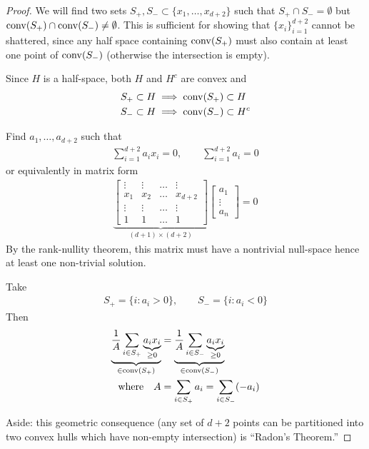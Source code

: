 \begin{proof}
    We will find two sets $S_+, S_- \subset \{x_1, \ldots, x_{d+2}\}$ such
    that $S_+ \cap S_- = \emptyset$ but
    $\operatorname{conv}(S_+) \cap \operatorname{conv}(S_-) \neq \emptyset$.
    This is sufficient for showing that $\{x_i\}_{i=1}^{d+2}$ cannot
    be shattered, since any half space containing $\operatorname{conv}(S_+)$ must also
    contain at least one point of $\operatorname{conv}(S_-)$ (otherwise the intersection is empty).

    Since $H$ is a half-space, both $H$ and $H^c$ are convex and
    \begin{align}
        S_+ \subset H &\implies \operatorname{conv}(S_+) \subset H \\
        S_- \subset H &\implies \operatorname{conv}(S_-) \subset H^c \\
    \end{align}
    
    Find $a_1, \ldots, a_{d+2}$ such that
    \begin{align}
        \sum_{i=1}^{d+2} a_i x_i = 0, \qquad \sum_{i=1}^{d+2} a_i = 0
    \end{align}
    or equivalently in matrix form
    \begin{align}
        \underbrace{\begin{bmatrix}
            \vdots & \vdots & \hdots & \vdots \\
            x_1 & x_2 & \hdots & x_{d+2} \\
            \vdots & \vdots & \hdots & \vdots \\
            1 & 1 & \hdots & 1
        \end{bmatrix}}_{(d+1) \times (d+2)} \begin{bmatrix}
            a_1 \\ \vdots \\ a_n
        \end{bmatrix} = 0
    \end{align}
    By the rank-nullity theorem, this matrix must have a nontrivial null-space
    hence at least one non-trivial solution.
    
    Take
    \begin{align}
        S_+ = \{ i : a_i > 0 \}, \qquad S_- = \{ i : a_i < 0 \}
    \end{align}
    Then
    \begin{align}
        \underbrace{\frac{1}{A} \sum_{i \in S_+} \underbrace{a_i x_i}_{\geq 0}}_{\in \operatorname{conv}(S_+)}
        &= \underbrace{\frac{1}{A} \sum_{i \in S_-} \underbrace{a_i x_i}_{\geq 0}}_{\in \operatorname{conv}(S_-)} \\
        \text{where} \quad A &= \sum_{i \in S_+} a_i = \sum_{i \in S_-} (-a_i)
    \end{align}
    
    Aside: this geometric consequence (any set of $d+2$ points can be partitioned into
    two convex hulls which have non-empty intersection) is ``Radon's Theorem.''
\end{proof}

